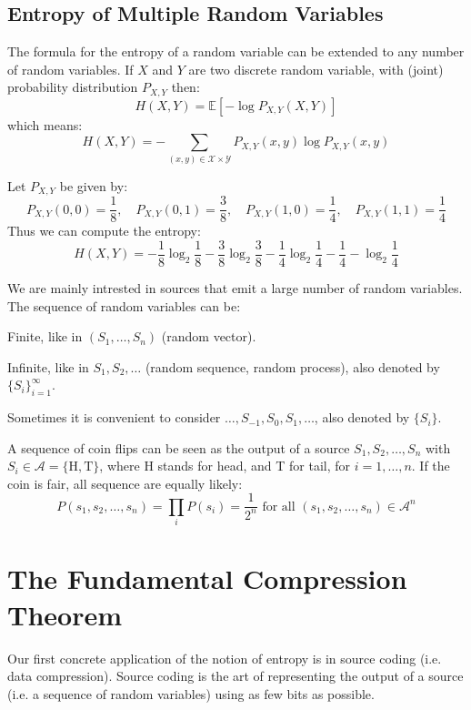 \subsection{Entropy of Multiple Random Variables}
The formula for the entropy of a random variable can be extended to any number of random variables. If $X$ and $Y$ are two discrete random variable, with (joint) probability distribution $P_{X,Y}$ then:
\[
    H(X, Y) = \mathbb{E}\left[- \log P_{X, Y}(X,Y)\right]
\]
which means:
\[
    H(X,Y) = - \sum_{(x, y) \in \mathcal{X} \times \mathcal{Y}} P_{X, Y}(x, y) \log P_{X, Y}(x,y)
\]

\begin{eg}
    Let $P_{X,Y}$ be given by:
    \[
        P_{X,Y}(0,0) = \frac{1}{8}, \quad P_{X,Y}(0,1) = \frac{3}{8}, \quad P_{X,Y}(1,0) = \frac{1}{4}, \quad P_{X,Y}(1,1) = \frac{1}{4}
    \]
    Thus we can compute the entropy:
    \[
        H(X,Y) = -\frac{1}{8} \log_2\frac{1}{8} - \frac{3}{8} \log_2 \frac{3}{8} - \frac{1}{4} \log_2 \frac{1}{4} - \frac{1}{4} - \log_2 \frac{1}{4}
    \]
\end{eg}
We are mainly intrested in sources that emit a large number of random variables. The sequence of random variables can be:
\begin{citemize}
    \item Finite, like in $(S_1, \ldots, S_n)$ (random vector).
    \item Infinite, like in $S_1, S_2, \ldots$ (random sequence, random process), also denoted by $\{S_i\}_{i = 1}^\infty$.
    \item Sometimes it is convenient to consider $\ldots, S_{-1}, S_0, S_1, \ldots$, also denoted by $\{S_i\}$.
\end{citemize}

\begin{eg}
    A sequence of coin flips can be seen as the output of a source $S_1, S_2, \ldots, S_n$ with $S_i \in \mathcal{A} = \{\text{H}, \text{T}\}$, where H stands for head, and T for tail, for $i = 1,\ldots, n$. If the coin is fair, all sequence are equally likely:
    \[
        P(s_1, s_2, \ldots, s_n) = \prod_{i}P(s_i) = \frac{1}{2^n} \text{ for all } (s_1, s_2, \ldots, s_n) \in \mathcal{A}^n
    \]
\end{eg}

\section{The Fundamental Compression Theorem}
Our first concrete application of the notion of entropy is in source coding (i.e. data compression). Source coding is the art of representing the output of a source (i.e. a sequence of random variables) using as few bits as possible. 

